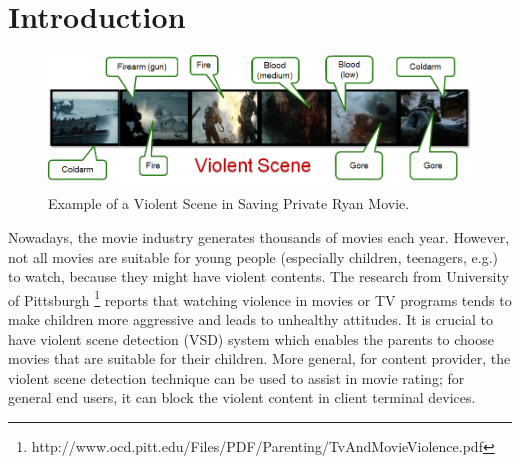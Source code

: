 \documentclass[review]{elsarticle}
\begin{document}
\linenumbers

\section{Introduction}

\begin{figure}[!b]
	\centering
	\includegraphics[width=1\linewidth]{Images/ViolentScene.png}
	\caption{Example of a Violent Scene in Saving Private Ryan Movie.}
	\label{fig:exampleVS}
\end{figure}

Nowadays, the movie industry generates thousands of movies each year. However, not all movies are suitable for young people (especially children, teenagers, e.g.) to watch, because they might have violent contents.   The research from University of Pittsburgh \footnote{http://www.ocd.pitt.edu/Files/PDF/Parenting/TvAndMovieViolence.pdf} reports that watching violence in movies or TV programs tends to make children more aggressive and leads to unhealthy attitudes. It is crucial to have violent scene detection (VSD) system which enables the parents to choose movies that are suitable for their children. More general, for content provider, the violent scene detection technique can be used to assist in movie rating; for general end users, it can block the violent content in client terminal devices. 
\end{document}
